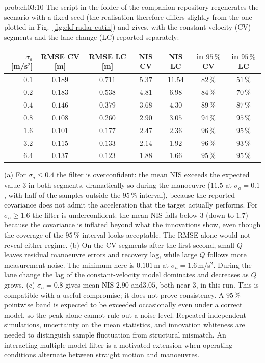 \begin{sol}{prob:ch03:10}
The script  in the folder  of the companion repository regenerates the scenario with a fixed seed (the realisation therefore differs slightly from the one plotted in Fig.~\ref{fig:ekf-radar-cutin}) and gives, with the constant-velocity (CV) segments and the lane change (LC) reported separately:
\begin{center}
\footnotesize
\setlength{\tabcolsep}{4pt}
\begin{tabular}{r cc cc cc}
\hline
$\sigma_a$ [m/s$^{2}$] & RMSE CV [m] & RMSE LC [m] & NIS CV & NIS LC & in $95\,\%$ CV & in $95\,\%$ LC\\
\hline
$0.1$ & $0.189$ & $0.711$ & $5.37$ & $11.54$ & $82\,\%$ & $51\,\%$\\
$0.2$ & $0.183$ & $0.538$ & $4.81$ & $6.98$ & $84\,\%$ & $70\,\%$\\
$0.4$ & $0.146$ & $0.379$ & $3.68$ & $4.30$ & $89\,\%$ & $87\,\%$\\
$0.8$ & $0.108$ & $0.260$ & $2.90$ & $3.05$ & $94\,\%$ & $95\,\%$\\
$1.6$ & $0.101$ & $0.177$ & $2.47$ & $2.36$ & $96\,\%$ & $95\,\%$\\
$3.2$ & $0.115$ & $0.133$ & $2.14$ & $1.92$ & $96\,\%$ & $93\,\%$\\
$6.4$ & $0.137$ & $0.123$ & $1.88$ & $1.66$ & $95\,\%$ & $95\,\%$\\
\hline
\end{tabular}
\end{center}
(a) For $\sigma_a\le0.4$ the filter is overconfident: the mean NIS exceeds the expected value $3$ in both segments, dramatically so during the manoeuvre ($11.5$ at $\sigma_a=0.1$, with half of the samples outside the $95\,\%$ interval), because the reported covariance does not admit the acceleration that the target actually performs. For $\sigma_a\ge1.6$ the filter is underconfident: the mean NIS falls below $3$ (down to $1.7$) because the covariance is inflated beyond what the innovations show, even though the coverage of the $95\,\%$ interval looks acceptable. The RMSE alone would not reveal either regime.
(b) On the CV segments after the first second, small $Q$ leaves residual manoeuvre errors and recovery lag, while large $Q$ follows more measurement noise. The minimum here is $0.101$\,m at $\sigma_a=1.6$\,m/s$^2$. During the lane change the lag of the constant-velocity model dominates and decreases as $Q$ grows.
(c) $\sigma_a=0.8$ gives mean NIS $2.90$ and\allowbreak $3.05$, both near $3$, in this run. This is compatible with a useful compromise; it does not prove consistency. A $95\,\%$ pointwise band is expected to be exceeded occasionally even under a correct model, so the peak alone cannot rule out a noise level. Repeated independent simulations, uncertainty on the mean statistics, and innovation whiteness are needed to distinguish sample fluctuation from structural mismatch. An interacting multiple-model filter is a motivated extension when operating conditions alternate between straight motion and manoeuvres.
\end{sol}

